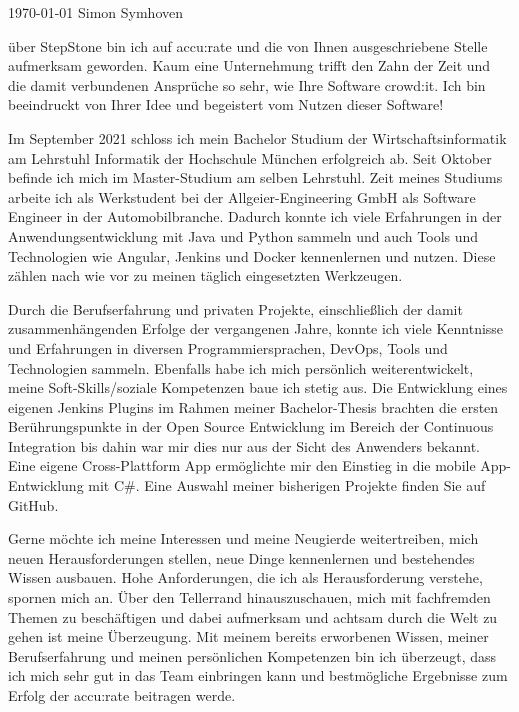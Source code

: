 \documentclass[11pt, a4paper]{awesome-cv}
\begin{document}
\makecvheader[R]

\makecvfooter
  {\today}
  {Simon Symhoven}
  {}

\makelettertitle

\begin{cvletter}
 
über StepStone bin ich auf accu:rate und die von Ihnen ausgeschriebene Stelle aufmerksam geworden. Kaum eine Unternehmung trifft den Zahn der Zeit und die damit verbundenen Ansprüche so sehr, wie Ihre Software crowd:it. Ich bin beeindruckt von Ihrer Idee und begeistert vom Nutzen dieser Software! 

Im September 2021 schloss ich mein Bachelor Studium der Wirtschaftsinformatik am Lehrstuhl Informatik der Hochschule München erfolgreich ab. Seit Oktober befinde ich mich im Master-Studium am selben Lehrstuhl. 
Zeit meines Studiums arbeite ich als Werkstudent bei der Allgeier-Engineering GmbH als Software Engineer in der Automobilbranche. Dadurch konnte ich viele Erfahrungen in der Anwendungsentwicklung mit Java und Python sammeln und auch Tools und Technologien wie Angular, Jenkins und Docker kennenlernen und nutzen. Diese zählen nach wie vor zu meinen täglich eingesetzten Werkzeugen.

Durch die Berufserfahrung und privaten Projekte, einschließlich der damit zusammenhängenden Erfolge der vergangenen Jahre, konnte ich viele Kenntnisse und Erfahrungen in diversen Programmiersprachen, DevOps, Tools und Technologien sammeln. Ebenfalls habe ich mich persönlich weiterentwickelt, meine Soft-Skills/soziale Kompetenzen baue ich stetig aus. 
Die Entwicklung eines eigenen Jenkins Plugins im Rahmen meiner Bachelor-Thesis brachten die ersten Berührungspunkte in der Open Source Entwicklung im Bereich der Continuous Integration \textemdash \;bis dahin war mir dies nur aus der Sicht des Anwenders bekannt. Eine eigene Cross-Plattform App ermöglichte mir den Einstieg in die mobile App-Entwicklung mit C\#. Eine Auswahl meiner bisherigen Projekte finden Sie auf GitHub. 

Gerne möchte ich meine Interessen und meine Neugierde weitertreiben, mich neuen Herausforderungen stellen, neue Dinge kennenlernen und bestehendes Wissen ausbauen. Hohe Anforderungen, die ich als Herausforderung verstehe, spornen mich an. Über den Tellerrand hinauszuschauen, mich mit fachfremden Themen zu beschäftigen und dabei aufmerksam und achtsam durch die Welt zu gehen ist meine Überzeugung. 
Mit meinem bereits erworbenen Wissen, meiner Berufserfahrung und meinen persönlichen Kompetenzen bin ich überzeugt, dass ich mich sehr gut in das Team einbringen kann und bestmögliche Ergebnisse zum Erfolg der accu:rate beitragen werde. 


\end{cvletter}
\end{document}
